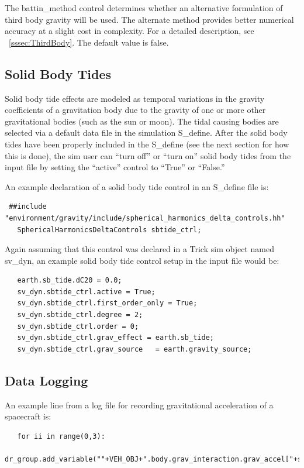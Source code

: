 The battin\_method control determines whether an alternative formulation
of third body gravity will be used. The alternate method provides better
numerical accuracy at a slight cost in complexity. For a detailed description,
see ~\ref{sssec:ThirdBody}. The default value is false.

\subsection{Solid Body Tides}
Solid body tide effects are modeled as temporal variations in the gravity
coefficients of a gravitation body due to the gravity of one or more other
gravitational bodies (such as the sun or moon).  The tidal causing bodies are
selected via a default data file in the simulation S\_define.  After the solid
body tides have been properly included in the S\_define (see the next section
for how this is done), the sim user can ``turn off'' or ``turn on''
solid body tides from the input file by setting the ``active'' control to
``True'' or ``False.''

An example declaration of a solid body tide control in an S\_define file is:
\begin{verbatim}
 ##include "environment/gravity/include/spherical_harmonics_delta_controls.hh"
   SphericalHarmonicsDeltaControls sbtide_ctrl;
\end{verbatim}

Again assuming that this control was declared in a Trick sim object named
sv\_dyn, an example solid body tide control setup in the input file would be:
\begin{verbatim}
   earth.sb_tide.dC20 = 0.0;
   sv_dyn.sbtide_ctrl.active = True;
   sv_dyn.sbtide_ctrl.first_order_only = True;
   sv_dyn.sbtide_ctrl.degree = 2;
   sv_dyn.sbtide_ctrl.order = 0;
   sv_dyn.sbtide_ctrl.grav_effect = earth.sb_tide;
   sv_dyn.sbtide_ctrl.grav_source   = earth.gravity_source;
\end{verbatim}


\subsection{Data Logging}
An example line from a log file for recording gravitational acceleration
of a spacecraft is:
\begin{verbatim}
   for ii in range(0,3):
    dr_group.add_variable(""+VEH_OBJ+".body.grav_interaction.grav_accel["+str(ii)+"]")
\end{verbatim}



